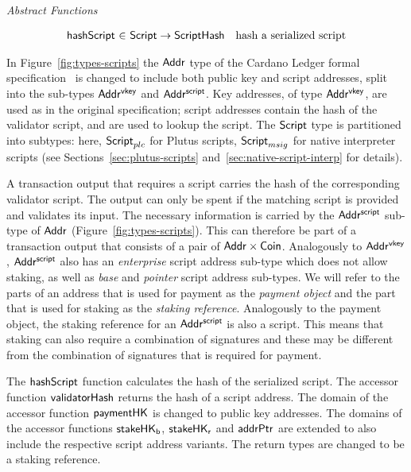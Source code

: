 \documentclass[11pt,a4paper,dvipsnames,twosided]{article}
\newcommand{\Addr}{\type{Addr}}
\newcommand{\AddrVKey}{\type{Addr^{vkey}}}
\newcommand{\Coin}{\type{Coin}}
\newcommand{\AddrScr}{\type{Addr^{script}}}
\newcommand{\HashScr}{\type{ScriptHash}}
\newcommand{\Script}{\type{Script}}
\newcommand{\ScriptPlutus}{\Script_{plc}}
\newcommand{\ScriptMSig}{\Script_{msig}}
\theoremstyle{definition}
\begin{document}
\begin{figure*}[hbt]
  \emph{Abstract Functions}

  \begin{equation*}
    \begin{array}{r@{~\in~}lr}
      \fun{hashScript} & \Script \to \HashScr & \text{hash a serialized script}
    \end{array}
  \end{equation*}

  \caption{Types for Scripts and Script Addresses}
  \label{fig:types-scripts}
\end{figure*}

In Figure~\ref{fig:types-scripts} the $\Addr$ type of the Cardano Ledger formal
specification~\cite{shelley_spec} is changed to include both public key and
script addresses, split into the sub-types $\AddrVKey$ and $\AddrScr$. Key
addresses, of type $\AddrVKey$, are used as in the original specification;
script addresses contain the hash of the validator script, and are used to
lookup the script. The $\Script$ type is partitioned into subtypes: here,
$\ScriptPlutus$ for Plutus scripts, $\ScriptMSig$ for native interpreter scripts
(see Sections~\ref{sec:plutus-scripts} and~\ref{sec:native-script-interp} for
details).

A transaction output that requires a script carries the hash of the
corresponding validator script. The output can only be spent if the matching
script is provided and validates its input. The necessary information is carried
by the $\AddrScr$ sub-type of $\Addr$ (Figure~\ref{fig:types-scripts}).  This
can therefore be part of a transaction output that consists of a pair of
$\Addr\times\Coin$. Analogously to $\AddrVKey$, $\AddrScr$ also has an
\emph{enterprise} script address sub-type which does not allow staking, as well
as \emph{base} and \emph{pointer} script address sub-types. We will refer to the
parts of an address that is used for payment as the \emph{payment object} and
the part that is used for staking as the \emph{staking reference}. Analogously
to the payment object, the staking reference for an $\AddrScr$ is also a script.
This means that staking can also require a combination of signatures and these
may be different from the combination of signatures that is required for
payment.

The $\mathsf{hashScript}$ function calculates the hash of the serialized
script. The accessor function $\mathsf{validatorHash}$ returns the hash of a script
address. The domain of the accessor function $\mathsf{paymentHK}$ is changed to
public key addresses. The domains of the accessor functions $\mathsf{stakeHK_b}$,
$\mathsf{stakeHK_{r}}$ and $\mathsf{addrPtr}$ are extended to also include the
respective script address variants. The return types are changed to be a staking
reference.
\end{document}

